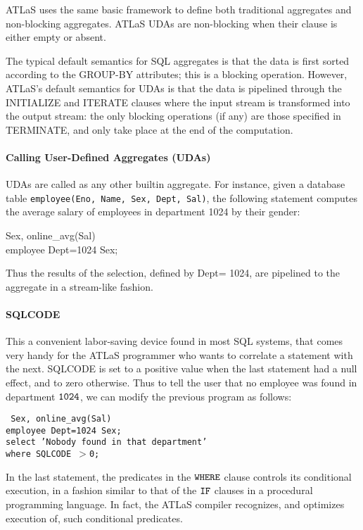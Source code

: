 ATLaS uses the same basic framework to define both traditional
aggregates and non-blocking aggregates. ATLaS UDAs are non-blocking
when their {} clause is either empty or absent.

The typical default
semantics for SQL aggregates is that the data is first sorted
according to the {\cw GROUP-BY} attributes; this is
a blocking operation.  However, ATLaS's default
semantics for UDAs is that the data is pipelined through the
{\cw INITIALIZE} and {\cw ITERATE} clauses where the input stream is transformed
into the output stream: the only blocking operations (if any) are
those specified in {\cw TERMINATE}, and only take place at the end of the
computation.


\paragraph{Calling User-Defined Aggregates (UDAs)} UDAs are called as any other builtin aggregate.  For instance,
given a database table {\tt {employee(Eno, Name, Sex, Dept,
Sal)}}, the following statement computes the average salary of
employees in department 1024 by their gender:


\begin{codedisplay}
\>\>\>\>\>\> Sex, online\_avg(Sal)\\
\>\>\>\>\>\> employee  Dept=1024 
Sex;\\
\end{codedisplay}


Thus the results of the selection, defined by {\bw Dept= 1024}, are pipelined to
the aggregate in a stream-like fashion.

\paragraph{SQLCODE}
This a convenient labor-saving device found in most
SQL systems, that comes very
handy for the ATLaS programmer who
wants to correlate a statement with
the next. SQLCODE is set to a positive value when the last
statement had a null effect, and to zero otherwise.
Thus to tell the user that no
employee was found in department $\tt 1024$, we can modify the previous
program as follows:


\begin{codedisplay}
\tt
\>\>\>\>\>\> Sex, online\_avg(Sal)\\
\>\>\>\>\>\> employee  Dept=1024 
Sex;\\
\>\>\>\>\>\>select 'Nobody found in that department'\\
\> \> \> \> \>  \> \> \> \> \>where SQLCODE $>$0;\\
\end{codedisplay}
In the last statement, the predicates in the $\tt WHERE$ clause controls its
conditional execution, in a fashion similar to that of the $\tt IF$ clauses in
a procedural programming language. In fact, the  ATLaS compiler recognizes,
and optimizes execution of, such conditional predicates.

